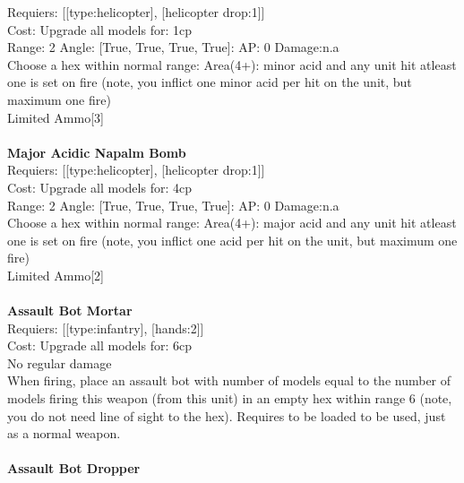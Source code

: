 Requiers: [[type:helicopter], [helicopter drop:1]] \\
Cost: Upgrade all models for: 1cp \\


Range: 2  Angle: [True, True, True, True]: AP: 0 Damage:n.a \\
Choose a hex within normal range: Area(4+): minor acid and any unit hit atleast one is set on fire (note, you inflict one minor acid per hit on the unit, but maximum one fire)\\ 
Limited Ammo[3]\\ 








\ \\
{\bf Major Acidic Napalm Bomb } \\

Requiers: [[type:helicopter], [helicopter drop:1]] \\
Cost: Upgrade all models for: 4cp \\


Range: 2  Angle: [True, True, True, True]: AP: 0 Damage:n.a \\
Choose a hex within normal range: Area(4+): major acid and any unit hit atleast one is set on fire (note, you inflict one acid per hit on the unit, but maximum one fire)\\ 
Limited Ammo[2]\\ 








\ \\
{\bf Assault Bot Mortar } \\

Requiers: [[type:infantry], [hands:2]] \\
Cost: Upgrade all models for: 6cp \\
No regular damage\\ 
When firing, place an assault bot with number of models equal to the number of models firing this weapon (from this unit) in an empty hex within range 6 (note, you do not need line of sight to the hex). Requires to be loaded to be used, just as a normal weapon.\\ 









\ \\
{\bf Assault Bot Dropper } \\

